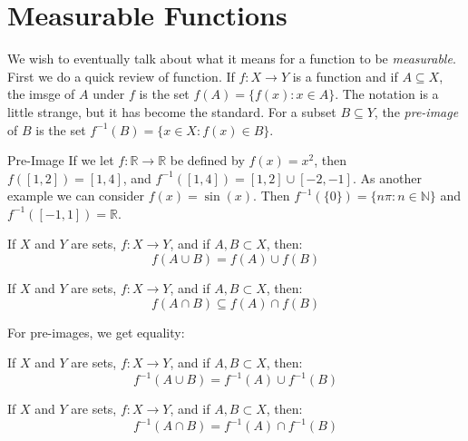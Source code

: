 \section{Measurable Functions}
    We wish to eventually talk about what it means for a
    function to be \textit{measurable}. First we do a quick review
    of function. If $f:X\rightarrow{Y}$ is a function and if
    $A\subseteq{X}$, the imsge of $A$ under $f$ is the set
    $f(A)=\{f(x):x\in{A}\}$. The notation is a little strange, but
    it has become the standard. For a subset $B\subseteq{Y}$, the
    \textit{pre-image} of $B$ is the set
    $f^{-1}(B)=\{x\in{X}:f(x)\in{B}\}$.
    \begin{lexample}{}{Pre-Image}
        If we let $f:\mathbb{R}\rightarrow\mathbb{R}$ be defined
        by $f(x)=x^{2}$, then $f([1,2])=[1,4]$, and
        $f^{-1}([1,4])=[1,2]\cup[-2,-1]$. As another example we
        can consider $f(x)=\sin(x)$. Then
        $f^{-1}(\{0\})=\{n\pi:n\in\mathbb{N}\}$ and
        $f^{-1}([-1,1])=\mathbb{R}$.
    \end{lexample}
    \begin{theorem}
        If $X$ and $Y$ are sets, $f:X\rightarrow{Y}$,
        and if $A,B\subset{X}$, then:
        \begin{equation}
            f(A\cup{B})=f(A)\cup{f}(B)
        \end{equation}
    \end{theorem}
    \begin{theorem}
        If $X$ and $Y$ are sets, $f:X\rightarrow{Y}$,
        and if $A,B\subset{X}$, then:
        \begin{equation}
            f(A\cap{B})\subseteq{f(A)\cap{f}(B)}
        \end{equation}
    \end{theorem}
    For pre-images, we get equality:
    \begin{theorem}
        If $X$ and $Y$ are sets, $f:X\rightarrow{Y}$,
        and if $A,B\subset{X}$, then:
        \begin{equation}
            f^{-1}(A\cup{B})=f^{-1}(A)\cup{f}^{-1}(B)
        \end{equation}
    \end{theorem}
    \begin{theorem}
        If $X$ and $Y$ are sets, $f:X\rightarrow{Y}$,
        and if $A,B\subset{X}$, then:
        \begin{equation}
            f^{-1}(A\cap{B})=f^{-1}(A)\cap{f}^{-1}(B)
        \end{equation}
    \end{theorem}
